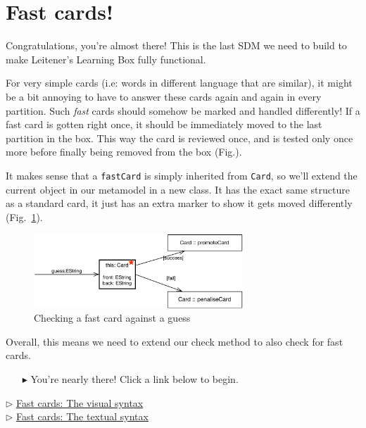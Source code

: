 \newpage
\section{Fast cards!}
\genHeader
\hypertarget{sec:fastCard}{}

Congratulations, you're almost there! This is the last SDM we need to build to make Leitener's Learning Box fully functional.

For very simple cards (i.e: words in different language that are similar), it might be a bit annoying to have to answer these cards again and again in every
partition. Such \emph{fast} cards should somehow be marked and handled differently! If a fast card is gotten right once, it should be immediately moved to the
last partition in the box. This way the card is reviewed once, and is tested only once more before finally being removed from the box (Fig.).

It makes sense that a \texttt{fastCard} is simply inherited from \texttt{Card}, so we'll extend the current object in our metamodel in a new class. It has the
exact same structure as a standard card, it just has an extra marker to show it gets moved differently (Fig.~\ref{fig:goal_fastCard}).

\begin{figure}[htbp]
	\centering
    \includegraphics[width=0.7\textwidth]{goal_fastCard}
	\caption{Checking a fast card against a guess}
	\label{fig:goal_fastCard}
\end{figure}
\FloatBarrier

Overall, this means we need to extend our check method to also check for fast cards.

\vspace{0.5cm}
\begin{itemize}
\item[$\blacktriangleright$] You're nearly there! Click a link below to begin.
\end{itemize}

\begin{center} {$\triangleright$ \hyperlink{fastCard vis}{Fast cards: The visual syntax}}%
\\ \vspace{0.5cm}
{$\triangleright$ \hyperlink{fastCard tex}{Fast cards: The textual syntax}}\end{center} 
 


